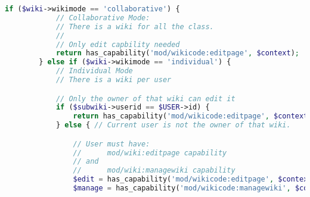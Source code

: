 \begin{lstlisting}[language=PHP]
        if ($wiki->wikimode == 'collaborative') {
            // Collaborative Mode:
            // There is a wiki for all the class.
            //
            // Only edit capbility needed
            return has_capability('mod/wikicode:editpage', $context);
        } else if ($wiki->wikimode == 'individual') {
            // Individual Mode
            // There is a wiki per user

            // Only the owner of that wiki can edit it
            if ($subwiki->userid == $USER->id) {
                return has_capability('mod/wikicode:editpage', $context);
            } else { // Current user is not the owner of that wiki.

                // User must have:
                //      mod/wiki:editpage capability
                // and
                //      mod/wiki:managewiki capability
                $edit = has_capability('mod/wikicode:editpage', $context);
                $manage = has_capability('mod/wikicode:managewiki', $context);


\end{lstlisting}
